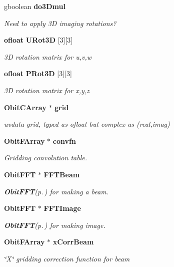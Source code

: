 \begin{CompactItemize}
gboolean {\bf do3Dmul}
\begin{CompactList}\small\item\em Need to apply 3D imaging rotations? \item\end{CompactList}\item 
{\bf ofloat} {\bf URot3D} [3][3]
\begin{CompactList}\small\item\em 3D rotation matrix for u,v,w \item\end{CompactList}\item 
{\bf ofloat} {\bf PRot3D} [3][3]
\begin{CompactList}\small\item\em 3D rotation matrix for x,y,z \item\end{CompactList}\item 
{\bf Obit\-CArray} $\ast$ {\bf grid}
\begin{CompactList}\small\item\em uvdata grid, typed as ofloat but complex as (real,imag) \item\end{CompactList}\item 
{\bf Obit\-FArray} $\ast$ {\bf convfn}
\begin{CompactList}\small\item\em Gridding convolution table. \item\end{CompactList}\item 
{\bf Obit\-FFT} $\ast$ {\bf FFTBeam}
\begin{CompactList}\small\item\em {\bf Obit\-FFT}{\rm (p.\,\pageref{structObitFFT})} for making a beam. \item\end{CompactList}\item 
{\bf Obit\-FFT} $\ast$ {\bf FFTImage}
\begin{CompactList}\small\item\em {\bf Obit\-FFT}{\rm (p.\,\pageref{structObitFFT})} for making image. \item\end{CompactList}\item 
{\bf Obit\-FArray} $\ast$ {\bf x\-Corr\-Beam}
\begin{CompactList}\small\item\em \char`\"{}X\char`\"{} gridding correction function for beam \item\end{CompactList}\item 

\end{CompactItemize}
